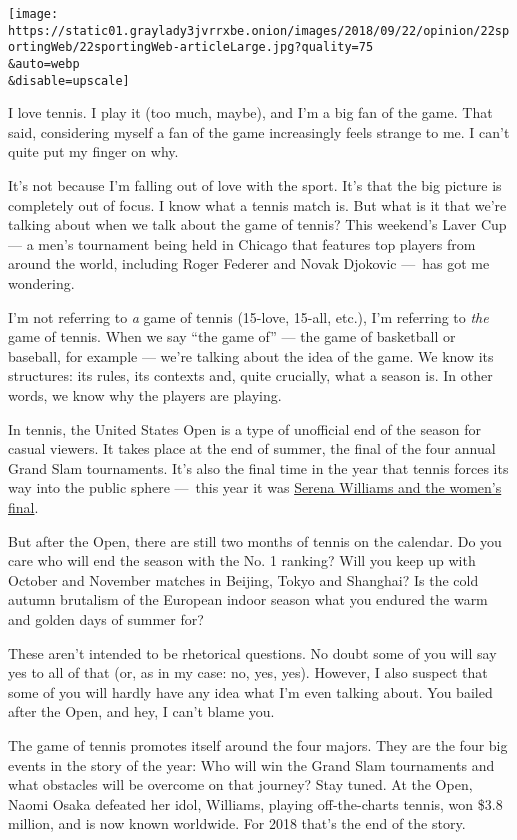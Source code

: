 \texttt{[image: https://static01.graylady3jvrrxbe.onion/images/2018/09/22/opinion/22sportingWeb/22sportingWeb-articleLarge.jpg?quality=75\\\&auto=webp\\\&disable=upscale]}

I love tennis. I play it (too much, maybe), and I'm a big fan of the
game. That said, considering myself a fan of the game increasingly feels
strange to me. I can't quite put my finger on why.

It's not because I'm falling out of love with the sport. It's that the
big picture is completely out of focus. I know what a tennis match is.
But what is it that we're talking about when we talk about the game of
tennis? This weekend's Laver Cup --- a men's tournament being held in
Chicago that features top players from around the world, including Roger
Federer and Novak Djokovic ---~has got me wondering.

I'm not referring to \emph{a} game of tennis (15-love, 15-all, etc.),
I'm referring to \emph{the} game of tennis. When we say ``the game of''
--- the game of basketball or baseball, for example --- we're talking
about the idea of the game. We know its structures: its rules, its
contexts and, quite crucially, what a season is. In other words, we know
why the players are playing.

In tennis, the United States Open is a type of unofficial end of the
season for casual viewers. It takes place at the end of summer, the
final of the four annual Grand Slam tournaments. It's also the final
time in the year that tennis forces its way into the public sphere
---~this year it was
\href{https://www.nytimes3xbfgragh.onion/2018/09/09/sports/serena-williams-us-open-naomi-osaka.html}{Serena
Williams and the women's final}.

But after the Open, there are still two months of tennis on the
calendar. Do you care who will end the season with the No. 1 ranking?
Will you keep up with October and November matches in Beijing, Tokyo and
Shanghai? Is the cold autumn brutalism of the European indoor season
what you endured the warm and golden days of summer for?

These aren't intended to be rhetorical questions. No doubt some of you
will say yes to all of that (or, as in my case: no, yes, yes). However,
I also suspect that some of you will hardly have any idea what I'm even
talking about. You bailed after the Open, and hey, I can't blame you.

The game of tennis promotes itself around the four majors. They are the
four big events in the story of the year: Who will win the Grand Slam
tournaments and what obstacles will be overcome on that journey? Stay
tuned. At the Open, Naomi Osaka defeated her idol, Williams, playing
off-the-charts tennis, won \$3.8 million, and is now known worldwide.
For 2018 that's the end of the story.

